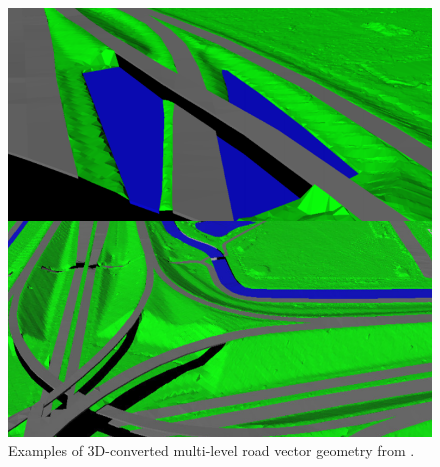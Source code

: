 \begin{figure}
    \includegraphics[width=\linewidth]{final_report/figs/oudeElberink_vosselman_2006_03.png} 
    \caption{Examples of 3D-converted multi-level road vector geometry from \cite{oudeElberink_vosselman_2006}.}
    \label{fig:conversionartefacts}
\end{figure}


